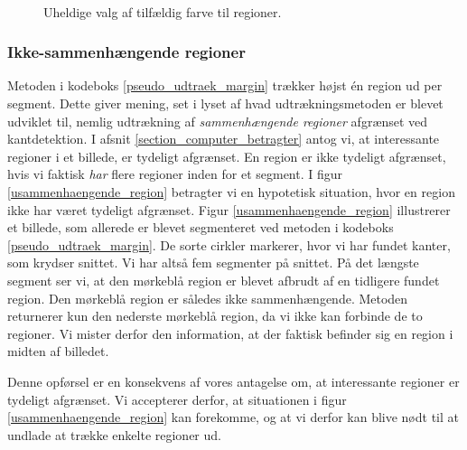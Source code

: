 {\begin{figure}[h]
    \\
    \caption[]{Uheldige valg af tilfældig farve til regioner.}
    \label{floodfill_colors}
\end{figure}

\subsubsection{Ikke-sammenhængende regioner}
Metoden i kodeboks \ref{pseudo_udtraek_margin} trækker højst én region
ud per segment. Dette giver mening, set i lyset af hvad
udtrækningsmetoden er blevet udviklet til, nemlig udtrækning af
\emph{sammenhængende regioner} afgrænset ved kantdetektion. I afsnit
\ref{section_computer_betragter} antog vi, at interessante regioner i et
billede, er tydeligt afgrænset. En region er ikke tydeligt afgrænset,
hvis vi faktisk \emph{har} flere regioner inden for et segment. I figur
\ref{usammenhaengende_region} betragter vi en hypotetisk situation, hvor
en region ikke har været tydeligt afgrænset. Figur
\ref{usammenhaengende_region} illustrerer et billede, som allerede er
blevet segmenteret ved metoden i kodeboks \ref{pseudo_udtraek_margin}.
De sorte cirkler markerer, hvor vi har fundet kanter, som krydser
snittet. Vi har altså fem segmenter på snittet. På det længste segment
ser vi, at den mørkeblå region er blevet afbrudt af en tidligere fundet
region. Den mørkeblå region er således ikke sammenhængende. Metoden
returnerer kun den nederste mørkeblå region, da vi ikke kan forbinde de
to regioner. Vi mister derfor den information, at der faktisk befinder
sig en region i midten af billedet.

Denne opførsel er en konsekvens af vores antagelse om, at interessante
regioner er tydeligt afgrænset. Vi accepterer derfor, at situationen i
figur \ref{usammenhaengende_region} kan forekomme, og at vi derfor kan
blive nødt til at undlade at trække enkelte regioner ud.

}
